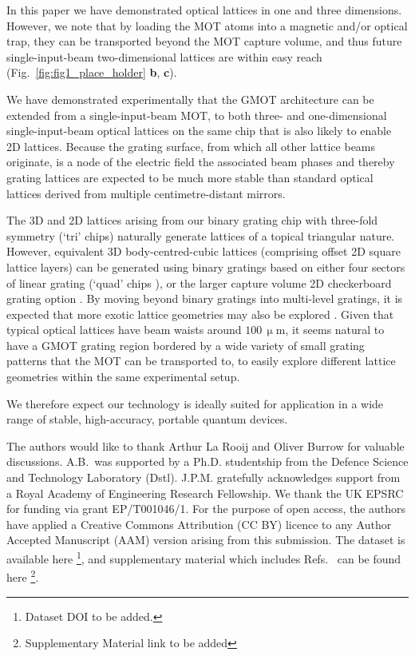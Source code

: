 \documentclass[aps,prl,floatfix,showpacs,twocolumn,amsmath,amssymb,superscriptaddress]{revtex4-2}
\begin{document}
In this paper we have demonstrated optical lattices in one and three dimensions. However, we note that by loading the MOT atoms into a magnetic and/or optical trap, they can be transported beyond the MOT capture volume, and thus future single-input-beam two-dimensional lattices are within easy reach (Fig.~\ref{fig:fig1_place_holder} \textbf{b}, \textbf{c}).

We have demonstrated experimentally that the GMOT architecture can be extended from a single-input-beam MOT, to both three- and one-dimensional single-input-beam optical lattices on the same chip that is also likely to enable 2D lattices. Because the grating surface, from which all other lattice beams originate, is a node of the electric field the associated beam phases and thereby grating lattices are expected to be much more stable than standard optical lattices derived from multiple centimetre-distant mirrors.

The 3D and 2D lattices arising from our binary grating chip with three-fold symmetry (`tri' chips) naturally generate lattices of a topical \cite{Struck2011,Xu2023,Mongkolkiattichai2023} triangular nature. However, equivalent 3D body-centred-cubic lattices (comprising offset 2D square lattice layers) can be generated using binary gratings based on either four sectors of linear grating (`quad' chips \cite{GMOT1_Nshii2013,Imhof2017,Burrow2021}), or the larger capture volume 2D checkerboard grating option \cite{GMOT1_Nshii2013}. By moving beyond binary gratings into multi-level gratings, it is expected that more exotic lattice geometries may  also be explored \cite{Viebahn2019,Wintersperger2020,Leung2020}. Given that typical optical lattices have beam waists around $100\,\upmu$m, it seems natural to have a GMOT grating region bordered by a wide variety of small grating patterns that the MOT can be transported to, to easily explore different lattice geometries within the same experimental setup. 

We therefore expect our technology is ideally suited for application in a wide range of stable, high-accuracy, portable quantum devices.
 
\begin{acknowledgments}
The authors would like to thank Arthur La Rooij and Oliver Burrow for valuable discussions. 
A.B.\ was supported by a Ph.D. studentship from the Defence Science and Technology Laboratory (Dstl). J.P.M. gratefully acknowledges support from a Royal Academy of Engineering Research Fellowship. We thank the UK EPSRC for funding via grant EP/T001046/1. For the purpose of open access, the
authors have applied a Creative Commons Attribution (CC BY)
licence to any Author Accepted Manuscript (AAM) version
arising from this submission. The dataset is available here \footnote{Dataset DOI to be added.}, and supplementary material which includes Refs.~\cite{Vangeleyn2010,Henderson2020,Arnold2000} can be found here \footnote{Supplementary Material link to be added}.
\end{acknowledgments}



%
\end{document}
